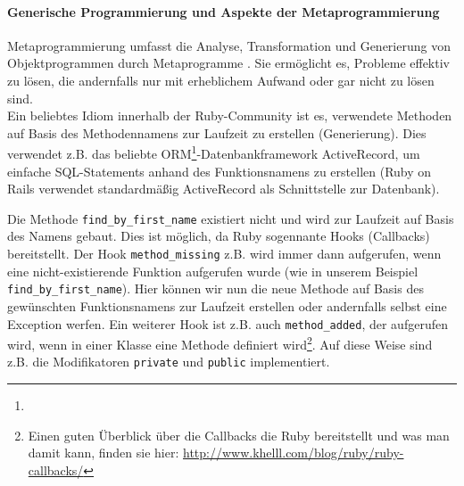\paragraph{Generische Programmierung und Aspekte der Metaprogrammierung}
Metaprogrammierung umfasst die Analyse, Transformation und Generierung von Objektprogrammen durch Metaprogramme \citep{herrmann_2005}.  Sie ermöglicht es, Probleme effektiv zu lösen, die andernfalls nur mit erheblichem Aufwand oder gar nicht zu lösen sind.\\
Ein beliebtes Idiom innerhalb der Ruby-Community ist es, verwendete Methoden auf Basis des Methodennamens zur Laufzeit zu erstellen (Generierung). Dies verwendet z.B. das beliebte ORM\footnote{}-Datenbankframework ActiveRecord, um einfache SQL-Statements anhand des Funktionsnamens zu erstellen (Ruby on Rails verwendet standardmäßig ActiveRecord als Schnittstelle zur Datenbank).
\begin{ruby}[label=IRB]
\end{ruby}


Die Methode \texttt{find\_by\_first\_name} existiert nicht und wird zur Laufzeit auf Basis des Namens gebaut. Dies ist möglich, da Ruby sogennante Hooks (Callbacks) bereitstellt. Der Hook \texttt{method\_missing} z.B. wird immer dann aufgerufen, wenn eine nicht-existierende Funktion aufgerufen wurde (wie in unserem Beispiel \texttt{find\_by\_first\_name}). Hier können wir nun die neue Methode auf Basis des gewünschten Funktionsnamens zur Laufzeit erstellen oder andernfalls selbst eine Exception werfen. Ein weiterer Hook ist z.B. auch \texttt{method\_added}, der aufgerufen wird, wenn in einer Klasse eine Methode definiert wird\footnote{Einen guten Überblick über die Callbacks die Ruby bereitstellt und was man damit kann, finden sie hier: \url{http://www.khelll.com/blog/ruby/ruby-callbacks/}}. Auf diese Weise sind z.B. die Modifikatoren \texttt{private} und \texttt{public} implementiert.

